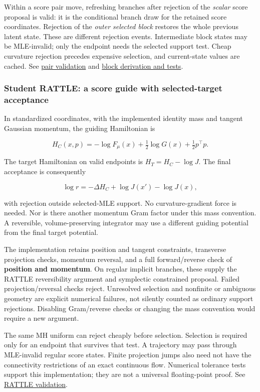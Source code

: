 \documentclass[
  10pt,
]{article}
\begin{document}
Within a score pair move, refreshing branches after rejection of the
\emph{scalar} score proposal is valid: it is the conditional branch draw
for the retained score coordinates. Rejection of the \emph{outer
selected block} restores the whole previous latent state. These are
different rejection events. Intermediate block states may be
MLE-invalid; only the endpoint needs the selected support test. Cheap
curvature rejection precedes expensive selection, and current-state
values are cached. See
\href{student_selected_mle_gibbs_validation.md}{pair validation} and
\href{cheap_selected_mle_gibbs.md}{block derivation and tests}.

\subsubsection{Student RATTLE: a score guide with selected-target
acceptance}\label{student-rattle-a-score-guide-with-selected-target-acceptance}

In standardized coordinates, with the implemented identity mass and
tangent Gaussian momentum, the guiding Hamiltonian is

\[
H_C(x,p)=-\log F_\mu(x)+\tfrac12\log G(x)+\tfrac12p^\top p.
\]

The target Hamiltonian on valid endpoints is \(H_T=H_C-\log J\). The
final acceptance is consequently

\[
\log r=-\Delta H_C+\log J(x')-\log J(x),
\]

with rejection outside selected-MLE support. No curvature-gradient force
is needed. Nor is there another momentum Gram factor under this mass
convention. A reversible, volume-preserving integrator may use a
different guiding potential from the final target potential.

The implementation retains position and tangent constraints, transverse
projection checks, momentum reversal, and a full forward/reverse check
of \textbf{position and momentum}. On regular implicit branches, these
supply the RATTLE reversibility argument and symplectic constrained
proposal. Failed projection/reversal checks reject. Unresolved selection
and nonfinite or ambiguous geometry are explicit numerical failures, not
silently counted as ordinary support rejections. Disabling Gram/reverse
checks or changing the mass convention would require a new argument.

The same MH uniform can reject cheaply before selection. Selection is
required only for an endpoint that survives that test. A trajectory may
pass through MLE-invalid regular score states. Finite projection jumps
also need not have the connectivity restrictions of an exact continuous
flow. Numerical tolerance tests support this implementation; they are
not a universal floating-point proof. See
\href{student_selected_mle_rattle_validation.md}{RATTLE validation}.
\end{document}
